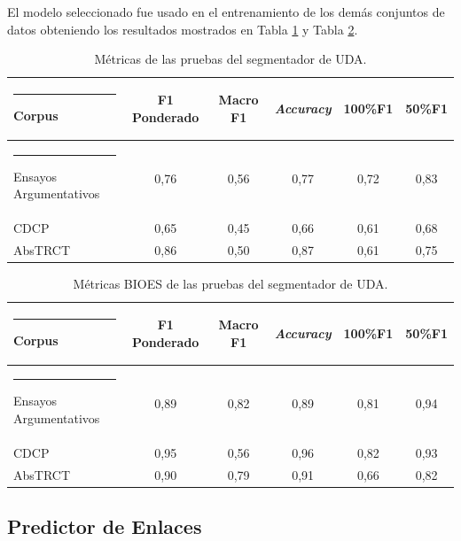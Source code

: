 \documentclass[a4paper,11pt,twocolumn,twoside]{article}
\begin{document}
El modelo seleccionado fue usado en el entrenamiento de los demás conjuntos de datos obteniendo los resultados mostrados
en Tabla \ref{table:test_metrics_segmenter} y Tabla \ref{table:test_bioes_metrics_segmenter}.

\begin{table}[h]
	\begin{center}
		\begin{tabular}{|l|c|c|c|c|c|} 
			\hline\rule{-2pt}{15pt}
			{\bf Corpus}                 & {\bf F1 Ponderado} & {\bf Macro F1} & {\bf \textit{Accuracy}} & {\bf 100\%F1} & {\bf 50\%F1} \\ 
			\hline\rule{-4pt}{10pt}
			Ensayos Argumentativos & 0,76         & 0,56     & 0,77            & 0,72    & 0,83   \\
			CDCP                   & 0,65         & 0,45     & 0,66            & 0,61    & 0,68   \\
			AbsTRCT                & 0,86         & 0,50     & 0,87            & 0,61    & 0,75   \\ 
			\hline
		\end{tabular}
	\end{center}
	\caption{\label{table:test_metrics_segmenter}Métricas de las pruebas del segmentador de UDA.}
\end{table}
\begin{table}[h]
	\begin{center}
		\begin{tabular}{|l|c|c|c|c|c|} 
			\hline\rule{-2pt}{15pt}
			{\bf Corpus}                 & {\bf F1 Ponderado} & {\bf Macro F1} & {\bf \textit{Accuracy}} & {\bf 100\%F1} & {\bf 50\%F1} \\ 
			\hline\rule{-4pt}{10pt}
			Ensayos Argumentativos & 0,89         & 0,82     & 0,89            & 0,81    & 0,94   \\
			CDCP                   & 0,95         & 0,56     & 0,96            & 0,82    & 0,93   \\
			AbsTRCT                & 0,90         & 0,79     & 0,91            & 0,66    & 0,82   \\
			\hline
		\end{tabular}
	\end{center}
	\caption{\label{table:test_bioes_metrics_segmenter}Métricas BIOES de las pruebas del segmentador de UDA.}
\end{table}

\subsection{Predictor de Enlaces}
\end{document}
